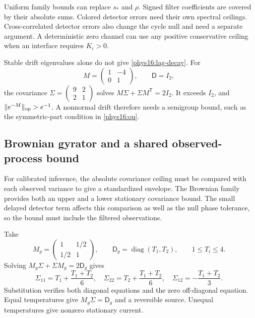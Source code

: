 Uniform family bounds can replace $s_*$ and $\rho$. Signed filter coefficients are covered by their absolute sums. Colored detector errors need their own spectral ceilings. Cross-correlated detector errors also change the cycle null and need a separate argument. A deterministic zero channel can use any positive conservative ceiling when an interface requires $K_i>0$.

Stable drift eigenvalues alone do not give \eqref{phys16:lag-decay}. For
\[
 M=\begin{pmatrix}1&-4\\0&1\end{pmatrix},\qquad
 \mathsf D=I_2,
\]
the covariance $\Sigma=\left(\begin{smallmatrix}9&2\\2&1\end{smallmatrix}\right)$ solves $M\Sigma+\Sigma M^{\mathsf T}=2I_2$. It exceeds $I_2$, and $\|e^{-M}\|_{\rm op}>e^{-1}$. A nonnormal drift therefore needs a semigroup bound, such as the symmetric-part condition in \eqref{phys16:ou}.

\subsection{Brownian gyrator and a shared observed-process bound}

For calibrated inference, the absolute covariance ceiling must be compared with each observed variance to give a standardized envelope. The Brownian family provides both an upper and a lower stationary covariance bound. The small delayed detector term affects this comparison as well as the null phase tolerance, so the bound must include the filtered observations.

Take
\begin{equation}
 M_g=\begin{pmatrix}1&1/2\\1/2&1\end{pmatrix},\qquad
 \mathsf D_g=\operatorname{diag}(T_1,T_2),\qquad 1\le T_i\le4.
 \label{phys16:gyrator}
\end{equation}
Solving $M_g\Sigma+\Sigma M_g=2\mathsf D_g$ gives
\begin{equation}
 \Sigma_{11}=T_1+\frac{T_1+T_2}{6},\quad
 \Sigma_{22}=T_2+\frac{T_1+T_2}{6},\quad
 \Sigma_{12}=-\frac{T_1+T_2}{3}.
 \label{phys16:gyrator-covariance}
\end{equation}
Substitution verifies both diagonal equations and the zero off-diagonal equation. Equal temperatures give $M_g\Sigma=\mathsf D_g$ and a reversible source. Unequal temperatures give nonzero stationary current.

